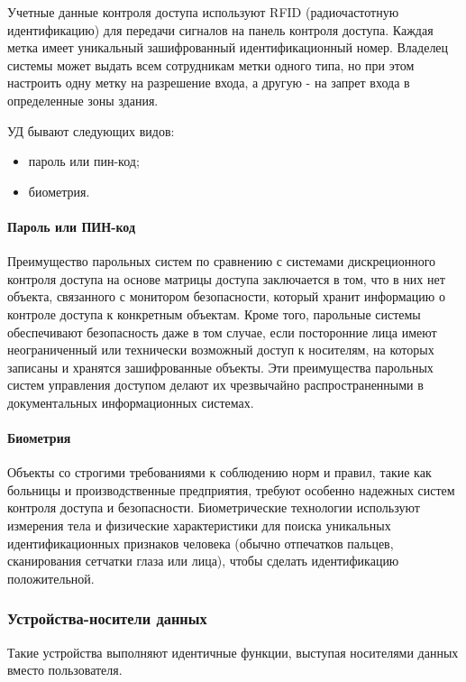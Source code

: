 Учетные данные контроля доступа используют RFID (радиочастотную идентификацию) для передачи сигналов на панель контроля доступа. Каждая метка имеет уникальный зашифрованный идентификационный номер. Владелец системы может выдать всем сотрудникам метки одного типа, но при этом настроить одну метку на разрешение входа, а другую - на запрет входа в определенные зоны здания.

УД бывают следующих видов:

\begin{itemize}
	\item пароль или пин-код;
	\item биометрия.
\end{itemize}


\paragraph{Пароль или ПИН-код}

Преимущество парольных систем по сравнению с системами дискреционного контроля доступа на основе матрицы доступа заключается в том, что в них нет объекта, связанного с монитором безопасности, который хранит информацию о контроле доступа к конкретным объектам. Кроме того, парольные системы обеспечивают безопасность даже в том случае, если посторонние лица имеют неограниченный или технически возможный доступ к носителям, на которых записаны и хранятся зашифрованные объекты. Эти преимущества парольных систем управления доступом делают их чрезвычайно распространенными в документальных информационных системах.

\paragraph{Биометрия}

Объекты со строгими требованиями к соблюдению норм и правил, такие как больницы и производственные предприятия, требуют особенно надежных систем контроля доступа и безопасности. Биометрические технологии используют измерения тела и физические характеристики для поиска уникальных идентификационных признаков человека (обычно отпечатков пальцев, сканирования сетчатки глаза или лица), чтобы сделать идентификацию положительной. 

\subsubsection{Устройства-носители данных}

Такие устройства выполняют идентичные функции, выступая носителями данных вместо пользователя.

